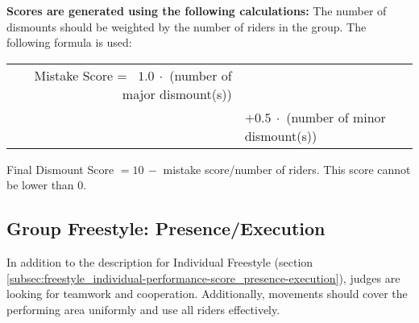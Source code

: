 \textbf{Scores are generated using the following calculations:}
The number of dismounts should be weighted by the number of riders in the group.
The following formula is used:

\begin{tabular}{r l}
Mistake Score = \ $1.0\ \cdot$ (number of major dismount(s)) \\
 & $+ 0.5\ \cdot$ (number of minor dismount(s)) \\
\end{tabular}

Final Dismount Score $= 10 \, -$ mistake score/number of riders.
This score cannot be lower than 0.

\subsection{Group Freestyle: Presence/Execution}
In addition to the description for Individual Freestyle (section \ref{subsec:freestyle_individual-performance-score_presence-execution}), judges are looking for teamwork and cooperation.
Additionally, movements should cover the performing area uniformly and use all riders effectively.

\newpage
